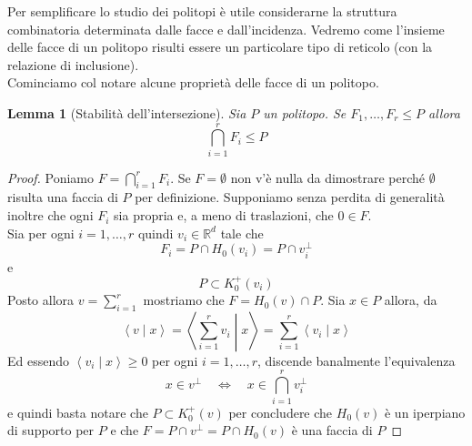 \documentclass[a4paper,12pt,italian]{article}
\newcommand{\Rd}{\mathbb{R}^d}
\newtheorem{lem}{Lemma}
\begin{document}
Per semplificare lo studio dei politopi \`e utile considerarne la struttura combinatoria determinata dalle facce e dall'incidenza. Vedremo
come l'insieme delle facce di un politopo risulti essere un particolare tipo di reticolo (con la relazione di inclusione).\\
Cominciamo col notare alcune propriet\`a delle facce di un politopo.
\begin{lem}[Stabilit\`a dell'intersezione]
Sia $P$ un politopo. Se $F_1,\dots,F_r\leq P$ allora
\begin{equation*}
\bigcap_{i=1}^r F_i\leq P
\end{equation*}
\end{lem}
\begin{proof}
Poniamo $F=\bigcap_{i=1}^r F_i$. Se $F=\emptyset$ non v'\`e nulla da dimostrare perch\'e $\emptyset$ risulta una faccia di $P$ per
definizione. Supponiamo senza perdita di generalit\`a inoltre che ogni $F_i$ sia propria e, a meno di traslazioni, che $0\in F$.\\
Sia per ogni $i=1,\dots,r$ quindi $v_i\in\Rd$ tale che
\begin{equation*}
F_i=P\cap H_0(v_i)=P\cap v_i^\bot
\end{equation*}
e
\begin{equation*}
P\subset K^+_0(v_i)
\end{equation*}
Posto allora $v=\sum_{i=1}^r$ mostriamo che $F=H_0(v)\cap P$. Sia $x\in P$ allora, da
\begin{equation*}
\left<v\mid x\right>=\left<\sum_{i=1}^r v_i\middle| x\right>=\sum_{i=1}^r\left<v_i\mid x\right>
\end{equation*}
Ed essendo $\left<v_i\mid x\right>\geq 0$ per ogni $i=1,\dots,r$, discende banalmente l'equivalenza
\begin{equation*}
x\in v^\bot\quad\Longleftrightarrow\quad x\in\bigcap_{i=1}^r v_i^\bot
\end{equation*}
e quindi basta notare che $P\subset K^+_0(v)$ per concludere che $H_0(v)$ \`e un iperpiano di supporto per $P$ e che
$F=P\cap v^\bot=P\cap H_0(v)$ \`e una faccia di $P$
\end{proof}
\end{document}
